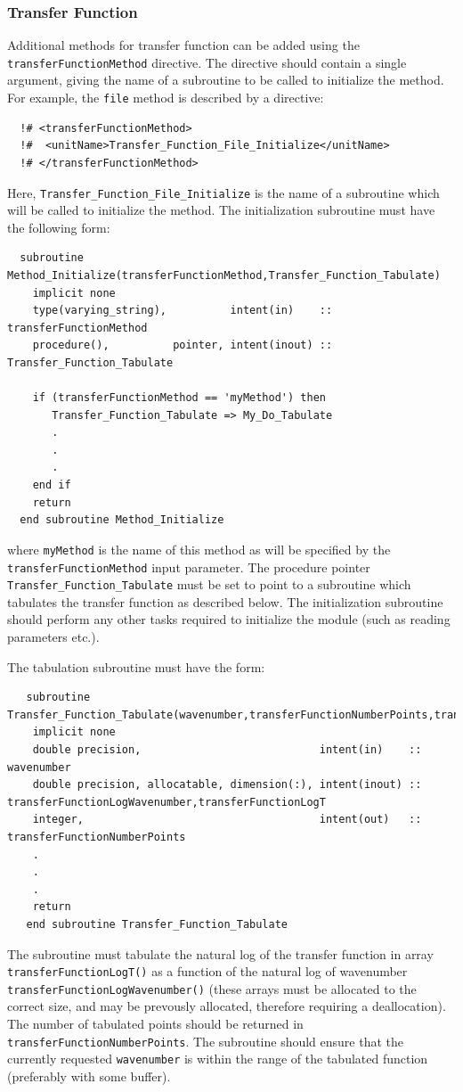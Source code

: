 \subsubsection{Transfer Function}\label{sec:TransferFunctionMethod}

Additional methods for transfer function can be added using the {\tt transferFunctionMethod} directive. The directive should contain a single argument, giving the name of a subroutine to be called to initialize the method. For example, the {\tt file} method is described by a directive:
\begin{verbatim}
  !# <transferFunctionMethod>
  !#  <unitName>Transfer_Function_File_Initialize</unitName>
  !# </transferFunctionMethod>
\end{verbatim}
Here, {\tt Transfer\_Function\_File\_Initialize} is the name of a subroutine which will be called to initialize the method. The initialization subroutine must have the following form:
\begin{verbatim}
  subroutine Method_Initialize(transferFunctionMethod,Transfer_Function_Tabulate)
    implicit none
    type(varying_string),          intent(in)    :: transferFunctionMethod
    procedure(),          pointer, intent(inout) :: Transfer_Function_Tabulate
    
    if (transferFunctionMethod == 'myMethod') then
       Transfer_Function_Tabulate => My_Do_Tabulate
       .
       .
       .
    end if
    return
  end subroutine Method_Initialize
\end{verbatim}
where {\tt myMethod} is the name of this method as will be specified by the {\tt transferFunctionMethod} input parameter. The procedure pointer {\tt Transfer\_Function\_Tabulate} must be set to point to a subroutine which tabulates the transfer function as described below. The initialization subroutine should perform any other tasks required to initialize the module (such as reading parameters etc.).

The tabulation subroutine must have the form:
\begin{verbatim}
   subroutine Transfer_Function_Tabulate(wavenumber,transferFunctionNumberPoints,transferFunctionWavenumber,transferFunctionT)
    implicit none
    double precision,                            intent(in)    :: wavenumber
    double precision, allocatable, dimension(:), intent(inout) :: transferFunctionLogWavenumber,transferFunctionLogT
    integer,                                     intent(out)   :: transferFunctionNumberPoints
    .
    .
    .
    return
   end subroutine Transfer_Function_Tabulate
\end{verbatim}
The subroutine must tabulate the natural log of the transfer function in array {\tt transferFunctionLogT()} as a function of the natural log of wavenumber {\tt transferFunctionLogWavenumber()} (these arrays must be allocated to the correct size, and may be prevously allocated, therefore requiring a deallocation). The number of tabulated points should be returned in {\tt transferFunctionNumberPoints}. The subroutine should ensure that the currently requested {\tt wavenumber} is within the range of the tabulated function (preferably with some buffer).

